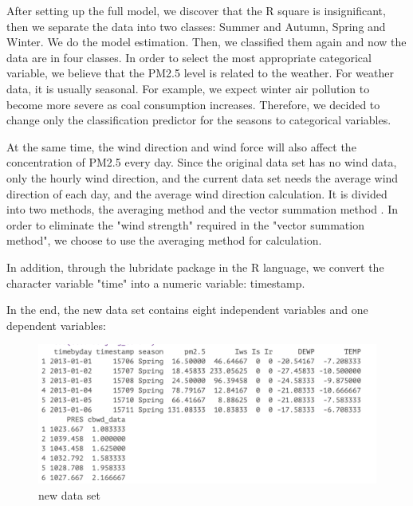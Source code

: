 After setting up the full model, we discover that the R square is insignificant, then we separate the data into two classes: Summer and Autumn, Spring and Winter. We do the model estimation. Then, we classified them again and now the data are in four classes. In order to select the most appropriate categorical variable, we believe that the PM2.5 level is related to the weather. For weather data, it is usually seasonal. For example, we expect winter air pollution to become more severe as coal consumption increases. Therefore, we decided to change only the classification predictor for the seasons to categorical variables.

At the same time, the wind direction and wind force will also affect the concentration of PM2.5 every day. Since the original data set has no wind data, only the hourly wind direction, and the current data set needs the average wind direction of each day, and the average wind direction calculation. It is divided into two methods, the averaging method and the vector summation method \citep{yueh1997modeling}. In order to eliminate the "wind strength" required in the "vector summation method", we choose to use the averaging method for calculation.

In addition, through the lubridate package in the R language, we convert the character variable "time" into a numeric variable: timestamp.

In the end, the new data set contains eight independent variables and one dependent variables:

\begin{figure}[h!]
\centering
\includegraphics[width=1.0\textwidth]{Figures/newdata.png}
\caption[Figures/newdata.png]{new data set}
\label{fig:new data set}
\end{figure}
